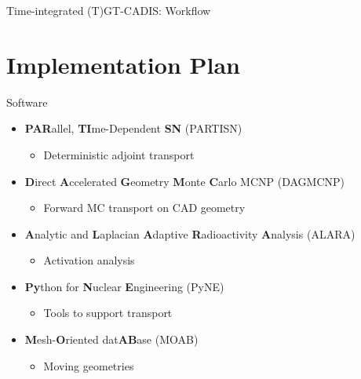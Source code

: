 \documentclass{beamer}
\begin{document}
\begin{frame}{Time-integrated (T)GT-CADIS: Workflow}
\begin{figure}
{
	}%
\end{figure}


\end{frame}


\section{Implementation Plan}

\begin{frame}{Software}
	\begin{itemize}
		\item{\textbf{PAR}allel, \textbf{TI}me-Dependent \textbf{SN} (PARTISN)}
		   \begin{itemize}
		   \item{Deterministic adjoint transport}
		   \end{itemize}
		\item{\textbf{D}irect \textbf{A}ccelerated \textbf{G}eometry 
		      \textbf{M}onte \textbf{C}arlo MCNP (DAGMCNP)}
		   \begin{itemize}
		   \item{Forward MC transport on CAD geometry}
		   \end{itemize}
		\item{\textbf{A}nalytic and \textbf{L}aplacian \textbf{A}daptive 
                      \textbf{R}adioactivity \textbf{A}nalysis (ALARA)}
		   \begin{itemize}
		   \item{Activation analysis}
		   \end{itemize}
		\item{\textbf{Py}thon for \textbf{N}uclear \textbf{E}ngineering (PyNE)}
		   \begin{itemize}
		   \item{Tools to support transport}
		   \end{itemize}
		\item{\textbf{M}esh-\textbf{O}riented dat\textbf{AB}ase (MOAB)}
		   \begin{itemize}
		   \item{Moving geometries}
		   \end{itemize}
	\end{itemize}
\end{frame}
\end{document}
